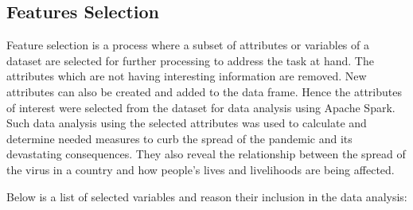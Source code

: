 \documentclass[12pt]{article}
\begin{document}
\subsection{Features Selection}
Feature selection is a process where a subset of attributes or variables of a dataset are selected for further processing to address the task at hand. The attributes which are  not having interesting information are removed. New  attributes can also be created and added to the data frame. Hence the  attributes  of interest were selected from the dataset for data analysis using Apache Spark.  Such data analysis using the selected attributes was used to calculate and determine needed measures to curb the spread of the pandemic and its devastating consequences. They also reveal the relationship between the spread of the virus in a country and how people's lives and livelihoods are being affected.

Below is a list of selected variables and reason their inclusion in the data analysis:
\end{document}
